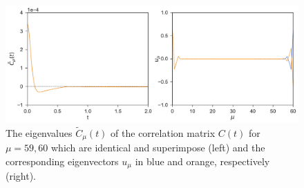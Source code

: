 \documentclass[b5paper,openright,10pt]{book}
\begin{document}
\begin{figure}[h!]
  \centering
\includegraphics[width=\linewidth]{EigenvaluesVectors-WALLS-66nodes}
\caption[Eigenvalues and eigenvectors near the walls for a confined fluid - Thin bins]{The eigenvalues $\tilde{C}_{\mu}(t)$ of the correlation matrix $C(t)$ for $\mu=59,60$ which are identical and superimpose (left) and the corresponding eigenvectors $u_{\mu}$ in blue and orange, respectively (right).}
\label{fig:EigenvaluesVectors-WALLS-66nodes}
\end{figure}
\end{document}
